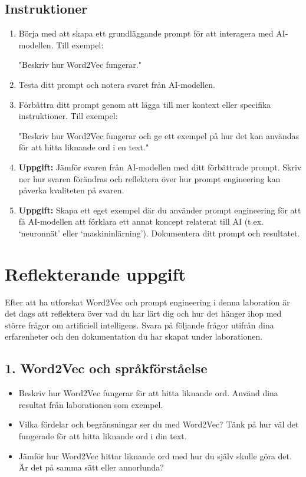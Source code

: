 \documentclass[a4paper, 12pt]{article}
\begin{document}
\subsection{Instruktioner}
\begin{enumerate}
    \item Börja med att skapa ett grundläggande prompt för att interagera med AI-modellen. Till exempel:
    \begin{codebox}
        "Beskriv hur Word2Vec fungerar."
    \end{codebox}
    
    \item Testa ditt prompt och notera svaret från AI-modellen.
    
    \item Förbättra ditt prompt genom att lägga till mer kontext eller specifika instruktioner. Till exempel:
    \begin{codebox}
        "Beskriv hur Word2Vec fungerar och ge ett exempel på hur det kan användas för att hitta liknande ord i en text."
    \end{codebox}
    
    \item \textbf{Uppgift:} Jämför svaren från AI-modellen med ditt förbättrade prompt. Skriv ner hur svaren förändras och reflektera över hur prompt engineering kan påverka kvaliteten på svaren.
    
    \item \textbf{Uppgift:} Skapa ett eget exempel där du använder prompt engineering för att få AI-modellen att förklara ett annat koncept relaterat till AI (t.ex. ‘neuronnät’ eller ‘maskininlärning’). Dokumentera ditt prompt och resultatet.
\end{enumerate}
\break

\section{Reflekterande uppgift}
Efter att ha utforskat Word2Vec och prompt engineering i denna laboration är det dags att reflektera över vad du har lärt dig och hur det hänger ihop med större frågor om artificiell intelligens. Svara på följande frågor utifrån dina erfarenheter och den dokumentation du har skapat under laborationen.

\subsection*{1. Word2Vec och språkförståelse}
\begin{itemize}
    \item Beskriv hur Word2Vec fungerar för att hitta liknande ord. Använd dina resultat från laborationen som exempel.
    \item Vilka fördelar och begränsningar ser du med Word2Vec? Tänk på hur väl det fungerade för att hitta liknande ord i din text.
    \item Jämför hur Word2Vec hittar liknande ord med hur du själv skulle göra det. Är det på samma sätt eller annorlunda?
\end{itemize}
\end{document}
